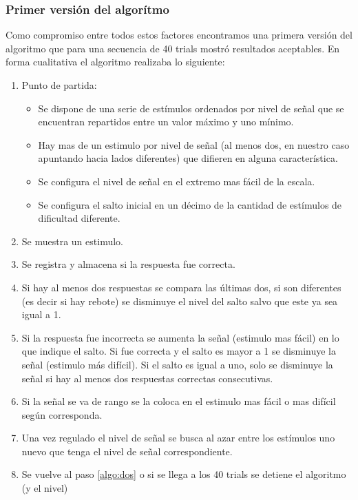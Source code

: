 \documentclass{article}
\begin{document}
    \subsubsection{Primer versión del algorítmo} \label{staircase1}
    
    Como compromiso entre todos estos factores encontramos una primera versión del algoritmo que para una secuencia de 40 trials mostró resultados aceptables. En forma cualitativa el algoritmo realizaba lo siguiente:
    
    \begin{enumerate}
        \item Punto de partida:
        \begin{itemize}
            \item Se dispone de una serie de estímulos ordenados por nivel de señal que se encuentran repartidos entre un valor máximo y uno mínimo. 
            \item Hay mas de un estimulo por nivel de señal (al menos dos, en nuestro caso apuntando hacia lados diferentes) que difieren en alguna característica.
            \item Se configura el nivel de señal en el extremo mas fácil de la escala. 
            \item Se configura el salto inicial en un décimo de la cantidad de estímulos de dificultad diferente.
        \end{itemize}
        \item Se muestra un estimulo. \label{algo:dos}
        \item Se registra y almacena si la respuesta fue correcta.
        \item Si hay al menos dos respuestas se compara las últimas dos, si son diferentes (es decir si hay rebote) se disminuye el nivel del salto salvo que este ya sea igual a 1.
        \item Si la respuesta fue incorrecta se aumenta la señal (estimulo mas fácil) en lo que indique el salto. Si fue correcta y el salto es mayor a 1 se disminuye la señal (estimulo más difícil). Si el salto es igual a uno, solo se disminuye la señal si hay al menos dos respuestas correctas consecutivas.  
        \item Si la señal se va de rango se la coloca en el estimulo mas fácil o mas difícil según corresponda. 
        \item Una vez regulado el nivel de señal se busca al azar entre los estímulos uno nuevo que tenga el nivel de señal correspondiente. 
        \item Se vuelve al paso \ref{algo:dos} o si se llega a los 40 trials se detiene el algoritmo (y el nivel)
    \end{enumerate}
    
\end{document}
